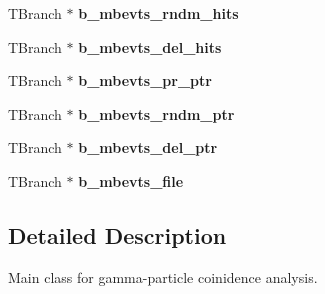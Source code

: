 \begin{DoxyCompactItemize}
\item 
\hypertarget{classg__clx_a5a8055b0d581696cd84f6a4b5b4c582f}{T\-Branch $\ast$ {\bfseries b\-\_\-mbevts\-\_\-rndm\-\_\-hits}}\label{classg__clx_a5a8055b0d581696cd84f6a4b5b4c582f}

\item 
\hypertarget{classg__clx_ab7d9842b440289a2274a926e7611bb2c}{T\-Branch $\ast$ {\bfseries b\-\_\-mbevts\-\_\-del\-\_\-hits}}\label{classg__clx_ab7d9842b440289a2274a926e7611bb2c}

\item 
\hypertarget{classg__clx_a9d647b0e87c194c34d426c949f610843}{T\-Branch $\ast$ {\bfseries b\-\_\-mbevts\-\_\-pr\-\_\-ptr}}\label{classg__clx_a9d647b0e87c194c34d426c949f610843}

\item 
\hypertarget{classg__clx_a992d0d4203d4ab5327153a81f199942f}{T\-Branch $\ast$ {\bfseries b\-\_\-mbevts\-\_\-rndm\-\_\-ptr}}\label{classg__clx_a992d0d4203d4ab5327153a81f199942f}

\item 
\hypertarget{classg__clx_a30a5429830731f534a82e57fd7c6c589}{T\-Branch $\ast$ {\bfseries b\-\_\-mbevts\-\_\-del\-\_\-ptr}}\label{classg__clx_a30a5429830731f534a82e57fd7c6c589}

\item 
\hypertarget{classg__clx_a76bc22e5d25b02dd39e4b22369bbcb46}{T\-Branch $\ast$ {\bfseries b\-\_\-mbevts\-\_\-file}}\label{classg__clx_a76bc22e5d25b02dd39e4b22369bbcb46}

\end{DoxyCompactItemize}


\subsection{Detailed Description}
Main class for gamma-\/particle coinidence analysis. 

